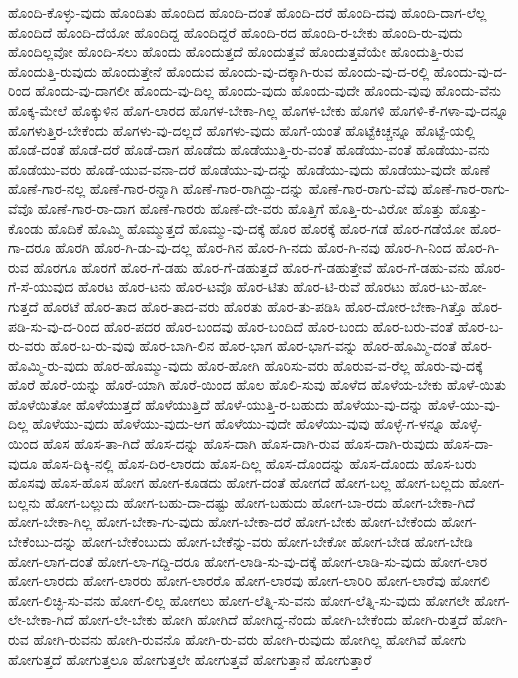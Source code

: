 {ಹೊಂದಿ-ಕೊಳ್ಳು-ವುದು
ಹೊಂದಿತು
ಹೊಂದಿದ
ಹೊಂದಿ-ದಂತೆ
ಹೊಂದಿ-ದರೆ
ಹೊಂದಿ-ದವು
ಹೊಂದಿ-ದಾಗ-ಲೆಲ್ಲ
ಹೊಂದಿದೆ
ಹೊಂದಿ-ದೆಯೋ
ಹೊಂದಿದ್ದ
ಹೊಂದಿದ್ದರೆ
ಹೊಂದಿ-ರದ
ಹೊಂದಿ-ರ-ಬೇಕು
ಹೊಂದಿ-ರು-ವುದು
ಹೊಂದಿಲ್ಲವೋ
ಹೊಂದಿ-ಸಲು
ಹೊಂದು
ಹೊಂದುತ್ತದೆ
ಹೊಂದುತ್ತವೆ
ಹೊಂದುತ್ತವೆಯೇ
ಹೊಂದುತ್ತಿ-ರುವ
ಹೊಂದುತ್ತಿ-ರುವುದು
ಹೊಂದುತ್ತೇನೆ
ಹೊಂದುವ
ಹೊಂದು-ವು-ದಕ್ಕಾಗಿ-ರುವ
ಹೊಂದು-ವು-ದ-ರಲ್ಲಿ
ಹೊಂದು-ವು-ದ-ರಿಂದ
ಹೊಂದು-ವು-ದಾಗಲೀ
ಹೊಂದು-ವು-ದಿಲ್ಲ
ಹೊಂದು-ವುದು
ಹೊಂದು-ವುದೇ
ಹೊಂದು-ವುವು
ಹೊಂದು-ವೆನು
ಹೊಕ್ಕ-ಮೇಲೆ
ಹೊಕ್ಕುಳಿನ
ಹೊಗ-ಲಾರದ
ಹೊಗಳ-ಬೇಕಾ-ಗಿಲ್ಲ
ಹೊಗಳ-ಬೇಕು
ಹೊಗಳಿ
ಹೊಗಳಿ-ಕೆ-ಗಳಾ-ವು-ದನ್ನೂ
ಹೊಗಳುತ್ತಿರ-ಬೇಕೆಂದು
ಹೊಗಳು-ವು-ದಲ್ಲದೆ
ಹೊಗಳು-ವುದು
ಹೊಗೆ-ಯಂತೆ
ಹೊಟ್ಟೆಕಿಚ್ಚನ್ನೂ
ಹೊಟ್ಟೆ-ಯಲ್ಲಿ
ಹೊಡೆ-ದಂತೆ
ಹೊಡೆ-ದರೆ
ಹೊಡೆ-ದಾಗ
ಹೊಡೆದು
ಹೊಡೆಯುತ್ತಿ-ರು-ವಂತೆ
ಹೊಡೆಯು-ವಂತೆ
ಹೊಡೆಯು-ವನು
ಹೊಡೆಯು-ವರು
ಹೊಡೆ-ಯುವ-ವನಾ-ದರೆ
ಹೊಡೆಯು-ವು-ದನ್ನು
ಹೊಡೆಯು-ವುದು
ಹೊಡೆಯು-ವುದೇ
ಹೊಣೆ
ಹೊಣೆ-ಗಾರ-ನಲ್ಲ
ಹೊಣೆ-ಗಾರ-ರನ್ನಾಗಿ
ಹೊಣೆ-ಗಾರ-ರಾಗಿದ್ದು-ದನ್ನು
ಹೊಣೆ-ಗಾರ-ರಾಗು-ವೆವು
ಹೊಣೆ-ಗಾರ-ರಾಗು-ವೆವೊ
ಹೊಣೆ-ಗಾರ-ರಾ-ದಾಗ
ಹೊಣೆ-ಗಾರರು
ಹೊಣೆ-ದೇ-ವರು
ಹೊತ್ತಿಗೆ
ಹೊತ್ತಿ-ರು-ವಿರೋ
ಹೊತ್ತು
ಹೊತ್ತು-ಕೊಂಡು
ಹೊದಿಕೆ
ಹೊಮ್ಮಿ
ಹೊಮ್ಮುತ್ತದೆ
ಹೊಮ್ಮು-ವು-ದಕ್ಕೆ
ಹೊರ
ಹೊರಕ್ಕೆ
ಹೊರ-ಗಡೆ
ಹೊರ-ಗಡೆಯೋ
ಹೊರ-ಗಾ-ದರೂ
ಹೊರಗಿ
ಹೊರ-ಗಿ-ಡು-ವು-ದಲ್ಲ
ಹೊರ-ಗಿನ
ಹೊರ-ಗಿ-ನದು
ಹೊರ-ಗಿ-ನವು
ಹೊರ-ಗಿ-ನಿಂದ
ಹೊರ-ಗಿ-ರುವ
ಹೊರಗೂ
ಹೊರಗೆ
ಹೊರ-ಗೆ-ಡಹು
ಹೊರ-ಗೆ-ಡಹುತ್ತದೆ
ಹೊರ-ಗೆ-ಡಹುತ್ತೇವೆ
ಹೊರ-ಗೆ-ಡಹು-ವನು
ಹೊರ-ಗೆ-ಸೆ-ಯುವುದ
ಹೊರಟ
ಹೊರ-ಟನು
ಹೊರ-ಟವೊ
ಹೊರ-ಟಿತು
ಹೊರ-ಟಿ-ರುವೆ
ಹೊರಟು
ಹೊರ-ಟು-ಹೋ-ಗುತ್ತದೆ
ಹೊರಟೆ
ಹೊರ-ತಾದ
ಹೊರ-ತಾದ-ವರು
ಹೊರತು
ಹೊರ-ತು-ಪಡಿಸಿ
ಹೊರ-ದೋರ-ಬೇಕಾ-ಗಿತ್ತೊ
ಹೊರ-ಪಡಿ-ಸು-ವು-ದ-ರಿಂದ
ಹೊರ-ಪದರ
ಹೊರ-ಬಂದವು
ಹೊರ-ಬಂದಿದೆ
ಹೊರ-ಬಂದು
ಹೊರ-ಬರು-ವಂತೆ
ಹೊರ-ಬ-ರು-ವರು
ಹೊರ-ಬ-ರು-ವುವು
ಹೊರ-ಬಾಗಿ-ಲಿನ
ಹೊರ-ಭಾಗ
ಹೊರ-ಭಾಗ-ವನ್ನು
ಹೊರ-ಹೊಮ್ಮಿ-ದಂತೆ
ಹೊರ-ಹೊಮ್ಮಿ-ರು-ವುದು
ಹೊರ-ಹೊಮ್ಮು-ವುದು
ಹೊರ-ಹೋಗಿ
ಹೊರಿಸು-ವರು
ಹೊರುವ-ವ-ರೆಲ್ಲ
ಹೊರು-ವು-ದಕ್ಕೆ
ಹೊರೆ
ಹೊರೆ-ಯನ್ನು
ಹೊರೆ-ಯಾಗಿ
ಹೊರೆ-ಯಿಂದ
ಹೊಲ
ಹೊಲಿ-ಸುವು
ಹೊಳೆದ
ಹೊಳೆಯ-ಬೇಕು
ಹೊಳೆ-ಯಿತು
ಹೊಳೆಯಿತೋ
ಹೊಳೆಯುತ್ತದೆ
ಹೊಳೆಯುತ್ತಿದೆ
ಹೊಳೆ-ಯುತ್ತಿ-ರ-ಬಹುದು
ಹೊಳೆಯು-ವು-ದನ್ನು
ಹೊಳೆ-ಯು-ವು-ದಿಲ್ಲ
ಹೊಳೆಯು-ವುದು
ಹೊಳೆಯು-ವುದು-ಆಗ
ಹೊಳೆಯು-ವುದೇ
ಹೊಳೆಯು-ವುವು
ಹೊಳ್ಳೆ-ಗ-ಳನ್ನೂ
ಹೊಳ್ಳೆ-ಯಿಂದ
ಹೊಸ
ಹೊಸ-ತಾ-ಗಿದೆ
ಹೊಸ-ದನ್ನು
ಹೊಸ-ದಾಗಿ
ಹೊಸ-ದಾಗಿ-ರುವ
ಹೊಸ-ದಾಗಿ-ರುವುದು
ಹೊಸ-ದಾ-ವುದೂ
ಹೊಸ-ದಿಕ್ಕಿ-ನಲ್ಲಿ
ಹೊಸ-ದಿರ-ಲಾರದು
ಹೊಸ-ದಿಲ್ಲ
ಹೊಸ-ದೊಂದನ್ನು
ಹೊಸ-ದೊಂದು
ಹೊಸ-ಬರು
ಹೊಸವು
ಹೊಸ-ಹೊಸ
ಹೋಗ
ಹೋಗ-ಕೂಡದು
ಹೋಗ-ದಂತೆ
ಹೋಗದೆ
ಹೋಗ-ಬಲ್ಲ
ಹೋಗ-ಬಲ್ಲದು
ಹೋಗ-ಬಲ್ಲನು
ಹೋಗ-ಬಲ್ಲುದು
ಹೋಗ-ಬಹು-ದಾ-ದಷ್ಟು
ಹೋಗ-ಬಹುದು
ಹೋಗ-ಬಾ-ರದು
ಹೋಗ-ಬೇಕಾ-ಗಿದೆ
ಹೋಗ-ಬೇಕಾ-ಗಿಲ್ಲ
ಹೋಗ-ಬೇಕಾ-ಗು-ವುದು
ಹೋಗ-ಬೇಕಾ-ದರೆ
ಹೋಗ-ಬೇಕು
ಹೋಗ-ಬೇಕೆಂದು
ಹೋಗ-ಬೇಕೆಂಬು-ದನ್ನು
ಹೋಗ-ಬೇಕೆಂಬುದು
ಹೋಗ-ಬೇಕೆನ್ನು-ವರು
ಹೋಗ-ಬೇಕೋ
ಹೋಗ-ಬೇಡ
ಹೋಗ-ಬೇಡಿ
ಹೋಗ-ಲಾಗ-ದಂತೆ
ಹೋಗ-ಲಾ-ಗದ್ದಿ-ದರೂ
ಹೋಗ-ಲಾಡಿ-ಸು-ವು-ದಕ್ಕೆ
ಹೋಗ-ಲಾಡಿ-ಸು-ವುದು
ಹೋಗ-ಲಾರ
ಹೋಗ-ಲಾರದು
ಹೋಗ-ಲಾರರು
ಹೋಗ-ಲಾರರೊ
ಹೋಗ-ಲಾರವು
ಹೋಗ-ಲಾರಿರಿ
ಹೋಗ-ಲಾರೆವು
ಹೋಗಲಿ
ಹೋಗ-ಲಿಚ್ಛಿ-ಸು-ವನು
ಹೋಗ-ಲಿಲ್ಲ
ಹೋಗಲು
ಹೋಗ-ಲೆತ್ನಿ-ಸು-ವನು
ಹೋಗ-ಲೆತ್ನಿ-ಸು-ವುದು
ಹೋಗಲೇ
ಹೋಗ-ಲೇ-ಬೇಕಾ-ಗಿದೆ
ಹೋಗ-ಲೇ-ಬೇಕು
ಹೋಗಿ
ಹೋಗಿದೆ
ಹೋಗಿದ್ದ-ನೆಂದು
ಹೋಗಿ-ಬೇಕೆಂದು
ಹೋಗಿ-ರುತ್ತದೆ
ಹೋಗಿ-ರುವ
ಹೋಗಿ-ರುವನು
ಹೋಗಿ-ರುವನೊ
ಹೋಗಿ-ರು-ವರು
ಹೋಗಿ-ರುವುದು
ಹೋಗಿಲ್ಲ
ಹೋಗಿವೆ
ಹೋಗು
ಹೋಗುತ್ತದೆ
ಹೋಗುತ್ತಲೂ
ಹೋಗುತ್ತಲೇ
ಹೋಗುತ್ತವೆ
ಹೋಗುತ್ತಾನೆ
ಹೋಗುತ್ತಾರೆ
}
